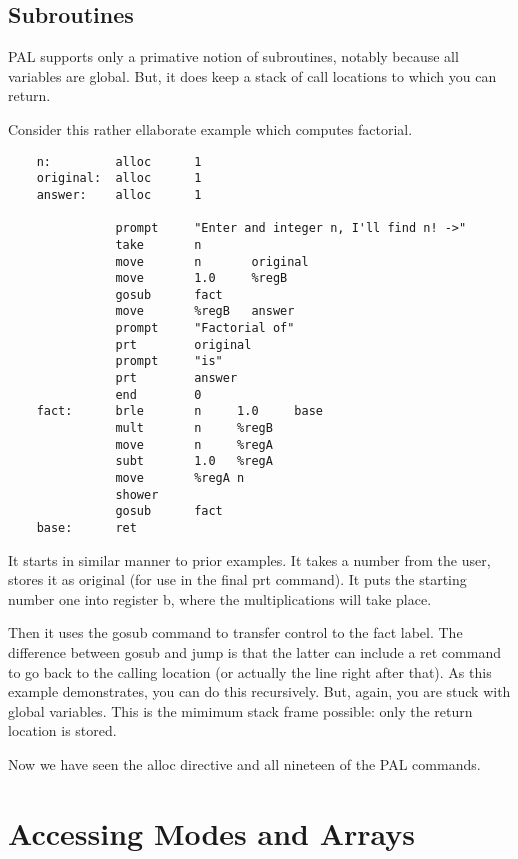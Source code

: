\subsection{Subroutines}

PAL supports only a primative notion of subroutines, notably because
all variables are global. But, it does keep a stack of call locations
to which you can return.

Consider this rather ellaborate example which computes factorial.

{\footnotesize
\begin{verbatim}
    n:         alloc      1
    original:  alloc      1
    answer:    alloc      1

               prompt     "Enter and integer n, I'll find n! ->"
               take       n
               move       n       original
               move       1.0     %regB
               gosub      fact
               move       %regB   answer
               prompt     "Factorial of"
               prt        original
               prompt     "is"
               prt        answer
               end        0
    fact:      brle       n     1.0     base
               mult       n     %regB
               move       n     %regA
               subt       1.0   %regA
               move       %regA n
               shower
               gosub      fact
    base:      ret
\end{verbatim}
}

It starts in similar manner to prior examples. It takes a number from
the user, stores it as original (for use in the final prt command).
It puts the starting number one into register b, where the multiplications
will take place.

Then it uses the gosub command to transfer control to the fact label.
The difference between gosub and jump is that the latter can include
a ret command to go back to the calling location (or actually the
line right after that). As this example demonstrates, you can do
this recursively. But, again, you are stuck with global variables.
This is the mimimum stack frame possible: only the return location is
stored.

Now we have seen the alloc directive and all nineteen of the PAL commands.

\section{Accessing Modes and Arrays}

